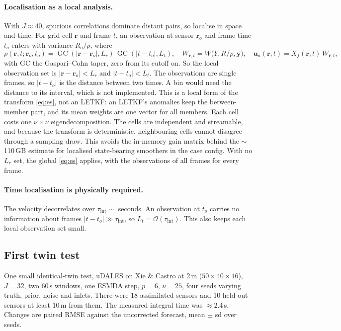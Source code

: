 \documentclass[11pt,a4paper]{article}
\begin{document}
\paragraph{Localisation as a local analysis.} With $J \approx 40$, spurious
correlations dominate distant pairs, so localise in space and time. For grid
cell $\bm r$ and frame $t$, an observation at sensor $\bm r_o$ and frame time
$t_o$ enters with variance $R_o/\rho$, where
\begin{equation}
  \rho(\bm r, t; \bm r_o, t_o)
  = \operatorname{GC}(|\bm r - \bm r_o|, L_r)\,
    \operatorname{GC}(|t - t_o|, L_t),
  \quad
  W_{\bm r, t} = W\big(Y, R/\rho, \bm y\big),
  \quad
  \bm u_a(\bm r, t) = X_f(\bm r, t)\, W_{\bm r,t},
  \label{eq:local}
\end{equation}
with GC the Gaspari--Cohn taper, zero from its cutoff on. So the local
observation set is $|\bm r - \bm r_o| < L_r$ and $|t - t_o| < L_t$. The
observations are single frames, so $|t - t_o|$ is the distance between two
times. A bin would need the distance to its interval, which is not implemented.
This is a local form of the transform \eqref{eq:es}, not an LETKF: an LETKF's
anomalies keep the between-member part, and its mean weights are one vector for
all members. Each cell costs one $\nu\times\nu$ eigendecomposition. The cells
are independent and streamable, and because the transform is deterministic,
neighbouring cells cannot disagree through a sampling draw. This avoids the
in-memory gain matrix behind the $\sim$110\,GB estimate for localised
state-bearing smoothers in the case config. With no $L_r$ set, the global
\eqref{eq:es} applies, with the observations of all frames for every frame.

\paragraph{Time localisation is physically required.} The velocity decorrelates
over $\tau_{\mathrm{int}} \sim$ seconds. An observation at $t_o$ carries no
information about frames $|t - t_o| \gg \tau_{\mathrm{int}}$, so
$L_t = \mathcal O(\tau_{\mathrm{int}})$. This also keeps each local observation
set small.

\subsection{First twin test}\label{sec:twin}
One small identical-twin test, uDALES on Xie \& Castro at 2\,m ($50\times40\times16$),
$J = 32$, two 60\,s windows, one ESMDA step, $p = 6$, $\nu = 25$, four seeds
varying truth, prior, noise and inlets. There were 18 assimilated sensors and 10
held-out sensors at least 10\,m from them. The measured integral time was
$\approx 2.4$\,s. Changes are paired RMSE against the uncorrected forecast, mean
$\pm$ sd over seeds.
\end{document}
